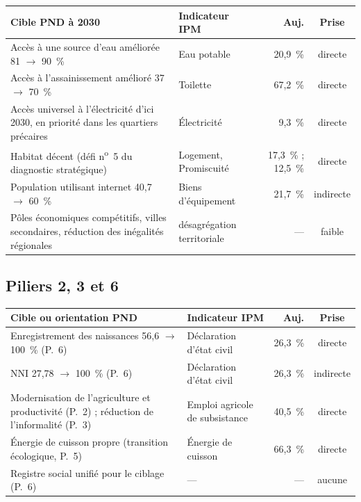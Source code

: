\documentclass[11pt,a4paper]{article}
\begin{document}
\begin{center}
\small
\begin{tabular}{@{}>{\RaggedRight}p{5.3cm}>{\RaggedRight}p{4.6cm}rc@{}}
\toprule
\textbf{Cible PND à 2030} & \textbf{Indicateur IPM} & \textbf{Auj.} & \textbf{Prise} \\
\midrule
Accès à une source d'eau améliorée 81 $\to$ 90~\% & Eau potable & 20,9~\% & directe \\
Accès à l'assainissement amélioré 37 $\to$ 70~\% & Toilette & 67,2~\% & directe \\
Accès universel à l'électricité d'ici 2030, en priorité
  dans les quartiers précaires & Électricité & 9,3~\% & directe \\
Habitat décent (défi n\textsuperscript{o}~5 du diagnostic stratégique) &
  Logement, Promiscuité & 17,3~\% ; 12,5~\% & directe \\
Population utilisant internet 40,7 $\to$ 60~\% & Biens d'équipement & 21,7~\% & indirecte \\
Pôles économiques compétitifs, villes secondaires, réduction des
  inégalités régionales & désagrégation territoriale & --- & faible \\
\bottomrule
\end{tabular}
\end{center}

\subsection{Piliers 2, 3 et 6}

\begin{center}
\small
\begin{tabular}{@{}>{\RaggedRight}p{5.3cm}>{\RaggedRight}p{4.6cm}rc@{}}
\toprule
\textbf{Cible ou orientation PND} & \textbf{Indicateur IPM} & \textbf{Auj.} & \textbf{Prise} \\
\midrule
Enregistrement des naissances 56,6 $\to$ 100~\% (P.~6) &
  Déclaration d'état civil & 26,3~\% & directe \\
NNI 27,78 $\to$ 100~\% (P.~6) & Déclaration d'état civil & 26,3~\% & indirecte \\
Modernisation de l'agriculture et productivité (P.~2) ;
  réduction de l'informalité (P.~3) &
  Emploi agricole de subsistance & 40,5~\% & directe \\
Énergie de cuisson propre (transition écologique, P.~5) &
  Énergie de cuisson & 66,3~\% & directe \\
Registre social unifié pour le ciblage (P.~6) & --- & --- & aucune \\
\bottomrule
\end{tabular}
\end{center}
\end{document}
